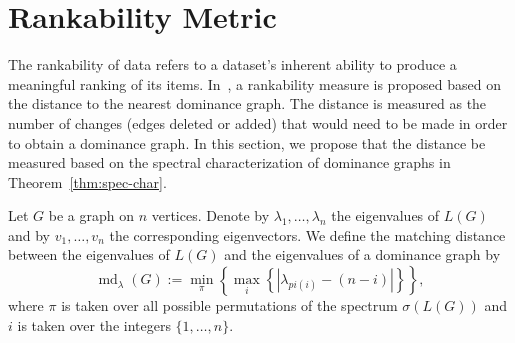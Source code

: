 \documentclass{article}
\DeclareMathOperator{\md}{md}
\begin{document}
\section{Rankability Metric}
The rankability of data refers to a dataset's inherent ability to produce a meaningful ranking of its items. 
In~\cite{Anderson2018}, a rankability measure is proposed based on the distance to the nearest dominance graph.
The distance is measured as the number of changes (edges deleted or added) that would need to be made in order to obtain a dominance graph.
In this section, we propose that the distance be measured based on the spectral characterization of dominance graphs in Theorem~\ref{thm:spec-char}.

Let $G$ be a graph on $n$ vertices.
Denote by $\lambda_{1},\ldots,\lambda_{n}$ the eigenvalues of $L(G)$ and by $v_{1},\ldots,v_{n}$ the corresponding eigenvectors. 
We define the matching distance between the eigenvalues of $L(G)$ and the eigenvalues of a dominance graph by
\[
\md_{\lambda}(G) := \min_{\pi}\left\{\max_{i}\left\{ |\lambda_{pi(i)}-(n-i)| \right\}\right\},
\]
where $\pi$ is taken over all possible permutations of the spectrum $\sigma(L(G))$ and $i$ is taken over the integers $\{1,\ldots,n\}$.






\end{document}
